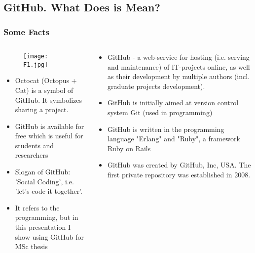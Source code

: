 \documentclass[pdflatex,compress,8pt,
	xcolor={dvipsnames,dvipsnames,svgnames,x11names,table},
	hyperref={
	breaklinks = true, 
	pdfauthor={Lemenkova Polina}, 
	pdfsubject={Preentation}, 
	pdfcreator={Lemenkova Polina}, 
	pdfproducer={Lemenkova Polina}, 
	colorlinks=true,linkcolor=blue, 
	citecolor=NavyBlue, 
	urlcolor = NavyBlue, 
	breaklinks = true}]{beamer}
\begin{document}
\subsection{GitHub. What Does is Mean?}
\begin{frame}\frametitle{Some Facts}
\begin{minipage}[0.4\textheight]{\textwidth}
\begin{columns}[T]
\begin{column}{0.5\textwidth}
\begin{figure}[H]
	\centering
		\texttt{[image: F1.jpg]}
\end{figure}
\begin{itemize}
	\item Octocat (Octopus + Cat) is a symbol of GitHub. It symbolizes sharing a project.
	\item GitHub is available for free which is useful for students and researchers
	\item Slogan of GitHub: 'Social Coding', i.e. 'let’s code it together'.
	\item It refers to the programming, but in this presentation I show using GitHub for MSc thesis
\end{itemize}
\end{column}
\begin{column}{0.5\textwidth}
\vspace{2em}
\begin{itemize}
	\item GitHub - a web-service for hosting (i.e. serving and maintenance) of IT-projects online, as well as their development by multiple authors (incl. graduate projects development).
	\item GitHub is initially aimed at version control system Git (used in programming)
	\item GitHub is written in the programming language "Erlang" and "Ruby", a framework Ruby on Rails
	\item GitHub was created by GitHub, Inc, USA. The first private repository was established in 2008.
\end{itemize}
\end{column}
\end{columns}
\end{minipage}
\end{frame}
\end{document}
